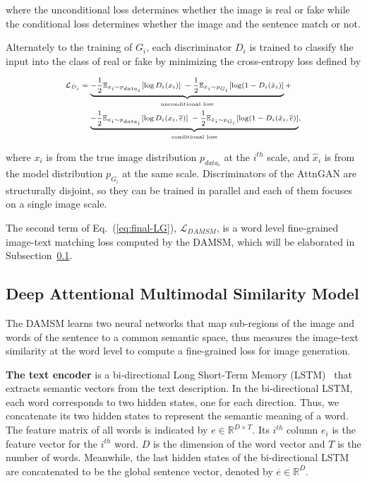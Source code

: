 where the unconditional loss determines whether the image is real or fake while the conditional loss determines whether the image and the sentence match or not. 

Alternately to the training of $G_i$, each discriminator $D_i$ is trained to classify the input into the class of real or fake by minimizing the cross-entropy loss defined by

\begin{equation}\label{eq:hybrid-LDi}
\scriptsize
\begin{aligned}
\mathcal{L}_{D_{i}} &= \underbrace{-\frac{1}{2}  \mathbb{E}_{x_{i} \sim {p_{data_i}}} [\log D_{i}(x_{i})] \; -\frac{1}{2} \mathbb{E}_{\hat{x}_{i} \sim {p_{G_{i}}}} [\log(1 - D_{i}(\hat{x}_{i})] }_\text{unconditional loss} + \\   
&\;\;\;\; \underbrace{-\frac{1}{2}  \mathbb{E}_{x_{i} \sim {p_{data_i}}} [\log D_{i}(x_{i}, \overline{e})] \; -\frac{1}{2} \mathbb{E}_{\hat{x}_{i} \sim {p_{G_{i}}}} [\log(1 - D_{i}(\hat{x}_{i}, \overline{e})] }_\text{conditional loss},
\end{aligned}
\end{equation}

where $x_i$ is from the true image distribution $p_{data_i}$ at the $i^{th}$ scale, and $\hat{x}_i$ is from the model distribution $p_{G_{i}}$ at the same scale. Discriminators of the AttnGAN are structurally disjoint, so they can be trained in parallel and each of them focuses on a single image scale. 

The second term of Eq.~(\ref{eq:final-LG}), $\mathcal{L}_{DAMSM}$, is a word level fine-grained image-text matching loss computed by the DAMSM, which will be elaborated in Subsection~\ref{sec:DAMSM}. 

\subsection{Deep Attentional Multimodal Similarity Model} \label{sec:DAMSM}

The DAMSM learns two neural networks that map sub-regions of the image and words of the sentence to a common semantic space, thus measures the image-text similarity at the word level to compute a fine-grained loss for image generation.  

\textbf{The text encoder }{ is a bi-directional Long Short-Term Memory (LSTM)~\cite{SchusterP97} that extracts semantic vectors from the text description. In the bi-directional LSTM, each word corresponds to two hidden states, one for each direction. Thus, we concatenate its two hidden states to represent the semantic meaning of a word. The feature matrix of all words is indicated by $e \in \mathbb{R}^{D\times T}$. Its $i^{th}$ column $e_i$ is the feature vector for the $i^{th}$ word. $D$ is the dimension of the word vector and $T$ is the number of words. Meanwhile, the last hidden states of the bi-directional LSTM are concatenated to be the global sentence vector, denoted by $\overline{e} \in \mathbb{R}^{D}$. 
} 

